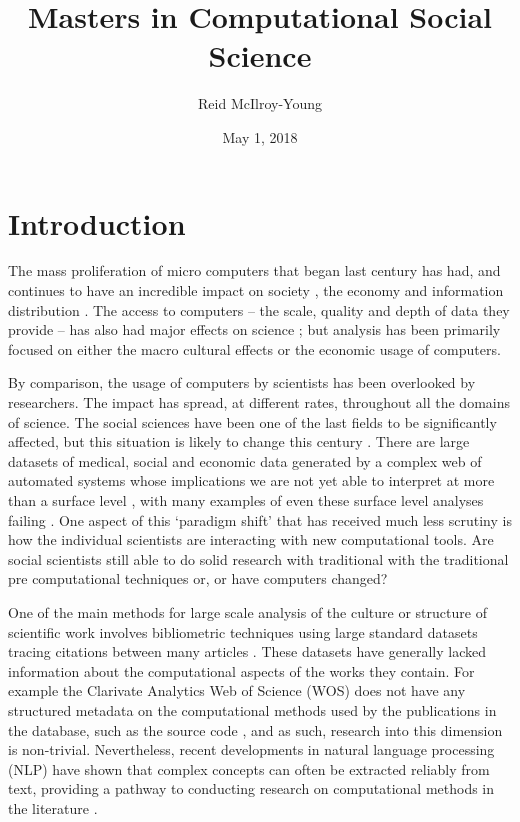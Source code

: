 \documentclass[12pt, a4paper]{article}
\author{Reid McIlroy-Young}
\title{Masters in Computational Social Science}
\date{May 1, 2018}
\begin{document}
\maketitle
\tableofcontents
\newpage
\listoffigures
\listoftables
\newpage
\doublespacing
\setcounter{page}{1}


\section{Introduction}

The mass proliferation of micro computers that began last century has had, and continues to have an incredible impact on society \citep{weizenbaum1972impact}, the economy \citep{gordon2000does} and information distribution \citep{berners2010world}. The access to computers -- the scale, quality and depth of data they provide -- has also had major effects on science \citep{lazer2009life}; but analysis has been primarily focused on either the macro cultural effects \citep{pfaffenberger1988social} or the economic usage \citep{landauer1995trouble} of computers.

By comparison, the usage of computers by scientists has been overlooked by researchers. The impact has spread, at different rates, throughout all the domains of science. The social sciences have been one of the last fields to be significantly affected, but this situation is likely to change this century \citep{watts2007twenty}. There are large datasets of medical, social and economic data generated by a complex web of automated systems whose implications we are not yet able to interpret at more than a surface level \citep{kossinets2006empirical} \citep{back2010emotional}, with many examples of even these surface level analyses failing \citep{lazer2014parable} \citep{kramer2014experimental}. One aspect of this `paradigm shift' that has received much less scrutiny is how the individual scientists are interacting with new computational tools. Are social scientists still able to do solid research with traditional with the traditional pre computational techniques or, or have computers changed?

One of the main methods for large scale analysis of the culture or structure of scientific work involves bibliometric techniques \citep{de2009bibliometrics} using large standard datasets tracing citations  between many articles \citep[e.g.][]{Boyack2005, borner2010atlas, borner2015atlas, sugimoto2013global, shi2015weaving, evans_meta, skupin2013visualizing}. These datasets have generally lacked information about the computational aspects of the works they contain. For  example the  Clarivate Analytics Web of Science (WOS) does not have any structured  metadata on the computational methods used by the publications in the database, such as the source code \citep{mkdocs}, and as such, research into this dimension is non-trivial. Nevertheless, recent developments in natural language processing (NLP) have shown that complex concepts can often be extracted reliably from text, providing a pathway to conducting research on computational methods in the literature \citep{evans2016machine} \citep{foster2015tradition}.
\end{document}
